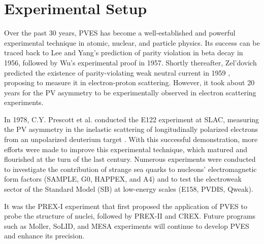 \chapter{Experimental Setup}
Over the past 30 years, PVES has become a well-established and powerful experimental technique in atomic, nuclear, and particle physics. Its success can be traced back to Lee and Yang's prediction of parity violation in beta decay in 1956, followed by Wu's experimental proof in 1957. Shortly thereafter, Zel'dovich predicted the existence of parity-violating weak neutral current in 1959 \cite{Zeldovich}, proposing to measure it in electron-proton scattering. However, it took about 20 years for the PV asymmetry to be experimentally observed in electron scattering experiments.

In 1978, C.Y. Prescott et al. conducted the E122 experiment at SLAC, measuring the PV asymmetry in the inelastic scattering of longitudinally polarized electrons from an unpolarized deuterium target \cite{PRESCOTT1978347}. With this successful demonstration, more efforts were made to improve this experimental technique, which matured and flourished at the turn of the last century. Numerous experiments were conducted to investigate the contribution of strange sea quarks to nucleons' electromagnetic form factors (SAMPLE, G0, HAPPEX, and A4) and to test the electroweak sector of the Standard Model (SB) at low-energy scales (E158, PVDIS, Qweak).

It was the PREX-I experiment that first proposed the application of PVES to probe the structure of nuclei, followed by PREX-II and CREX. Future programs such as M\/oller, SoLID, and MESA experiments will continue to develop PVES and enhance its precision.

